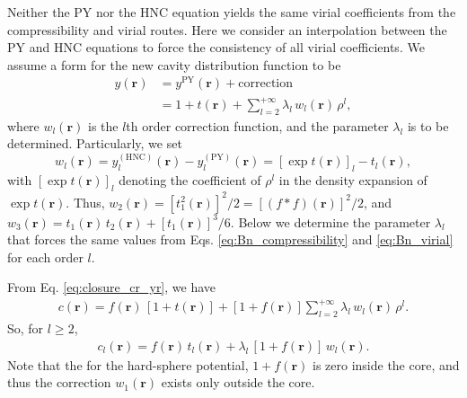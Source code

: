 \documentclass[aip,jcp,preprint,superscriptaddress,showpacs,preprintnumbers,amsmath,amssymb]{revtex4-1}
\newcommand{\vct}[1]{\mathbf{#1}}
\providecommand{\vr}{} %
\renewcommand{\vr}{\vct{r}}
\begin{document}
Neither the PY nor the HNC equation yields
the same virial coefficients from
the compressibility and virial routes.
%
Here we consider an interpolation between the PY and HNC equations
to force the consistency\cite{
hurst1965, rowlinson1965, rowlinson1966,
lado1967, *henderson1970, *zerah1986,
stell1969,
rogers1984,
rosenfeld1979,
hutchinson1971, hutchinson1972,
hall1980}
of all virial coefficients.
%
We assume a form for the new cavity distribution function to be
%
\begin{align*}
y(\vr)
&=
y^{\mathrm{PY}}(\vr)
+ \mathrm{correction}
\\
&=
1 + t(\vr)
+ \sum_{l = 2}^{+\infty} \lambda_l \, w_l(\vr) \, \rho^l,
\end{align*}
%
where
$w_l(\vr)$ is the $l$th order correction function,
and the parameter $\lambda_l$
is to be determined.
%
Particularly, we set
%
\begin{equation}
w_l(\vr)
=
y_l^{(\mathrm{HNC})}(\vr)
-
y_l^{(\mathrm{PY})}(\vr)
=
\left[ \exp t(\vr) \right]_l - t_l(\vr),
\label{eq:yr_trial}
\end{equation}
%
with
$[ \exp t(\vr) ]_l$
denoting the coefficient of $\rho^l$
in the density expansion of
$\exp t(\vr)$.
%
Thus,
$w_2(\vr)
= [t_1^2(\vr)]^2/2
= [(f*f)(\vr)]^2/2$,
and
$w_3(\vr)
= t_1(\vr) \, t_2(\vr)
+ [t_1(\vr)]^3/6$.
%
Below we determine the parameter $\lambda_l$
that forces the same values from
Eqs. \eqref{eq:Bn_compressibility} and \eqref{eq:Bn_virial}
for each order $l$.



From Eq. \eqref{eq:closure_cr_yr}, we have
\begin{align*}
c(\vr)
=
f(\vr) \, [1 + t(\vr)]
+
[1 + f(\vr)]
\sum_{l = 2}^{+\infty}
  \lambda_l \, w_l(\vr) \, \rho^l.
\end{align*}
%
So, for $l \ge 2$,
%
\begin{align}
c_l(\vr)
= f(\vr) \, t_l(\vr)
+ \lambda_l \, [ 1 + f(\vr) ] \, w_l(\vr).
\label{eq:cl_corrected}
\end{align}
%
Note that the for the hard-sphere potential,
$1+f(\vr)$ is zero inside the core,
and thus the correction $w_1(\vr)$ exists only outside the core.
\end{document}
